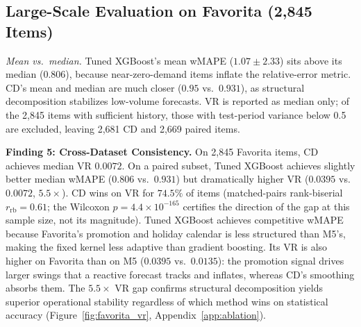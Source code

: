 \documentclass[10pt]{article} %
\theoremstyle{plain}
\theoremstyle{definition}
\begin{document}
\subsection{Large-Scale Evaluation on Favorita (2,845 Items)}

\begin{table}[h]
\centering
\footnotesize
\setlength{\tabcolsep}{3pt}
\caption{28-Day Forecast Performance and Bullwhip Mitigation on Favorita (2,669 paired items, global pooled kernel; mean $\pm$ std, VR and safety stock as median)}
\label{tab:favorita}
\end{table}

\textit{Mean vs.~median.} Tuned XGBoost's mean wMAPE ($1.07 \pm 2.33$) sits above its median ($0.806$), because near-zero-demand items inflate the relative-error metric. CD's mean and median are much closer ($0.95$ vs.~$0.931$), as structural decomposition stabilizes low-volume forecasts. VR is reported as median only; of the 2,845 items with sufficient history, those with test-period variance below 0.5 are excluded, leaving 2,681 CD and 2,669 paired items.

\textbf{Finding 5: Cross-Dataset Consistency.} On 2,845 Favorita items, CD achieves median VR $\mathbf{0.0072}$. On a paired subset, Tuned XGBoost achieves slightly better median wMAPE ($0.806$ vs.~$0.931$) but dramatically higher VR ($0.0395$ vs.~$0.0072$, $\mathbf{5.5\times}$). CD wins on VR for $74.5\%$ of items (matched-pairs rank-biserial $r_{\text{rb}} = 0.61$; the Wilcoxon $p = 4.4 \times 10^{-165}$ certifies the direction of the gap at this sample size, not its magnitude). Tuned XGBoost achieves competitive wMAPE because Favorita's promotion and holiday calendar is less structured than M5's, making the fixed kernel less adaptive than gradient boosting. Its VR is also higher on Favorita than on M5 ($0.0395$ vs.~$0.0135$): the promotion signal drives larger swings that a reactive forecast tracks and inflates, whereas CD's smoothing absorbs them. The $5.5\times$ VR gap confirms structural decomposition yields superior operational stability regardless of which method wins on statistical accuracy (Figure~\ref{fig:favorita_vr}, Appendix~\ref{app:ablation}).
\end{document}
